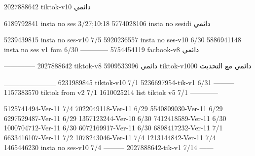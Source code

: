 2027888642 tiktok-v10
دائمي

6189792841 insta no ses
3/27;10:18
5774028106 insta no sesidi
دائمي

5239439815 insta no ses-v10
7/5
5920236557 insta no ses-v10
6/30
5886941148 insta no ses v1 fom
6/30
------------
5754454119 facbook-v8
دائمي


--------------
2027888642 tiktok-v8
دائمي
5909533996 tiktok-v1000
دائمي مع التحديث

__________
6231989845 tiktok-v10
7/1
5236697954-tik-v1
6/31
---------
1157383570 tiktok from v2
7/1
1610025214 list tiktok v5
7/1
------------

5125741494-Ver-11
7/4
7022049118-Ver-11
6/29
5540809030-Ver-11
6/29
6297529487-Ver-11
6/29
1357123244-Ver-10
6/30
7412418589-Ver-11
6/30
1000704712-Ver-11
6/30
6072169917-Ver-11
6/30
6898417232-Ver-11
7/1
6633416107-Ver-11
7/2
1078243046-Ver-11
7/4
1213144842-Ver-11
7/4
1465446230 insta no ses-v10
7/4
---------
2027888642-tik-v1
7/14
------
